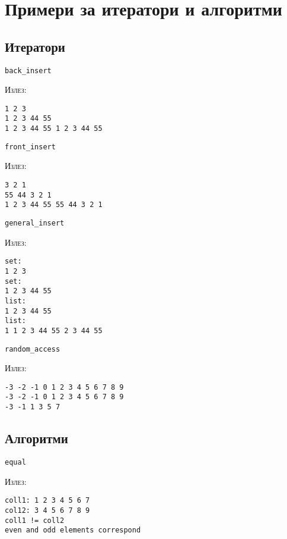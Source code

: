 


\lfoot{}
\cfoot{\thepage}
\rfoot{}
\usepackage{fancyvrb}
\usepackage{xcolor}
\usepackage{textcomp}



\section{Примери за итератори и алгоритми}

\subsection{Итератори}

\texttt{back\_insert}


\textsc{Излез:}
\begin{verbatim}
1 2 3 
1 2 3 44 55 
1 2 3 44 55 1 2 3 44 55
\end{verbatim}

\texttt{front\_insert}


\textsc{Излез:}
\begin{verbatim}
3 2 1 
55 44 3 2 1 
1 2 3 44 55 55 44 3 2 1
\end{verbatim}


\texttt{general\_insert}


\textsc{Излез:}
\begin{verbatim}
set: 
1 2 3 
set: 
1 2 3 44 55 
list: 
1 2 3 44 55 
list: 
1 1 2 3 44 55 2 3 44 55
\end{verbatim}

\texttt{random\_access}


\textsc{Излез:}
\begin{verbatim}
-3 -2 -1 0 1 2 3 4 5 6 7 8 9 
-3 -2 -1 0 1 2 3 4 5 6 7 8 9 
-3 -1 1 3 5 7
\end{verbatim}




\subsection{Алгоритми}

\texttt{equal}


\textsc{Излез:}
\begin{verbatim}
coll1: 1 2 3 4 5 6 7 
col12: 3 4 5 6 7 8 9 
coll1 != coll2
even and odd elements correspond
\end{verbatim}

